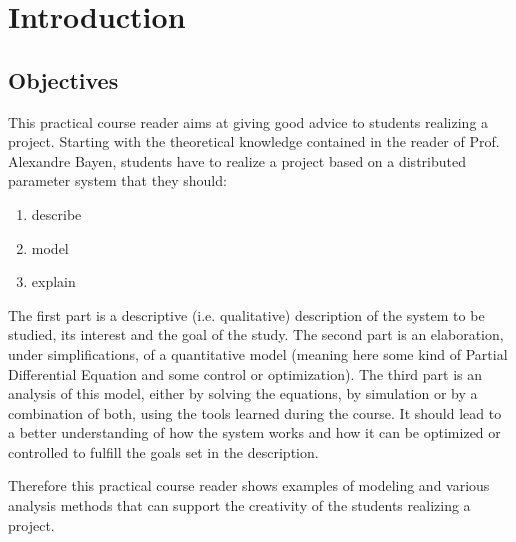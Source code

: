 \thispagestyle{empty}
\chapter{Introduction}
\label{introduction.chap}

\section{Objectives}

This practical course reader aims at giving good advice to students realizing a project. Starting with the theoretical knowledge contained in the reader of Prof. Alexandre Bayen, students have to realize a project based on a distributed parameter system that they should:
\begin{enumerate}
	\item describe
	\item model
	\item explain
\end{enumerate}
The first part is a descriptive (i.e. qualitative) description of the system to be studied, its interest and the goal of the study. The second part is an elaboration, under simplifications, of a quantitative model (meaning here some kind of Partial Differential Equation and some control or optimization). The third part is an analysis of this model, either by solving the equations, by simulation or by a combination of both, using the tools learned during the course. It should lead to a better understanding of how the system works and how it can be optimized or controlled to fulfill the goals set in the description.

Therefore this practical course reader shows examples of modeling and various analysis methods that can support the creativity of the students realizing a project.
